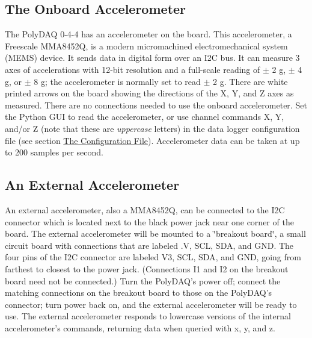 \hypertarget{pd_sensors_ss_onb_accel}{}\subsection{The Onboard Accelerometer}\label{pd_sensors_ss_onb_accel}
The Poly\-D\-A\-Q 0-\/4-\/4 has an accelerometer on the board. This accelerometer, a Freescale M\-M\-A8452\-Q, is a modern micromachined electromechanical system (M\-E\-M\-S) device. It sends data in digital form over an I2\-C bus. It can measure 3 axes of accelerations with 12-\/bit resolution and a full-\/scale reading of  $\pm$ 2 g, $\pm$ 4 g, or $\pm$ 8 g; the accelerometer is normally set to read $\pm$ 2 g. There are white printed arrows on the board showing the directions of the X, Y, and Z axes as measured. There are no connections needed to use the onboard accelerometer. Set the Python G\-U\-I to read the accelerometer, or use channel commands {\ttfamily X}, {\ttfamily Y}, and/or {\ttfamily Z} (note that these are {\itshape uppercase} letters) in the data logger configuration file (see section \hyperlink{pd_setup_pds_sd_config}{The Configuration File}). Accelerometer data can be taken at up to 200 samples per second.\hypertarget{pd_sensors_ss_ext_accel}{}\subsection{An External Accelerometer}\label{pd_sensors_ss_ext_accel}
An external accelerometer, also a M\-M\-A8452\-Q, can be connected to the I2\-C connector which is located next to the black power jack near one corner of the board. The external accelerometer will be mounted to a \char`\"{}breakout board\char`\"{}, a small circuit board with connections that are labeled {.\-V}, {\ttfamily S\-C\-L}, {\ttfamily S\-D\-A}, and {\ttfamily G\-N\-D}. The four pins of the I2\-C connector are labeled {\-V3}, {\ttfamily S\-C\-L}, {\ttfamily S\-D\-A}, and {\ttfamily G\-N\-D}, going from farthest to closest to the power jack. (Connections {\ttfamily I1} and {\ttfamily I2} on the breakout board need not be connected.) Turn the Poly\-D\-A\-Q's power off; connect the matching connections on the breakout board to those on the Poly\-D\-A\-Q's connector; turn power back on, and the external accelerometer will be ready to use. The external accelerometer responds to lowercase versions of the internal accelerometer's commands, returning data when queried with {\ttfamily x}, {\ttfamily y}, and {\ttfamily z}.

